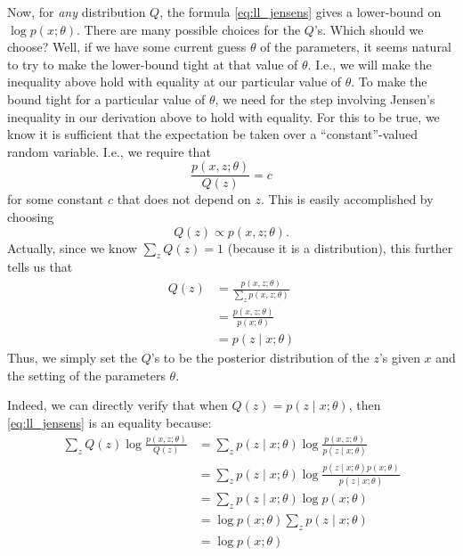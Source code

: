 Now, for \textit{any} distribution $Q$, the formula \ref{eq:ll_jensens} gives a lower-bound on
$\log p(x;\theta)$. There are many possible choices for the $Q$'s. Which should we
choose? Well, if we have some current guess $\theta$ of the parameters, it seems
natural to try to make the lower-bound tight at that value of $\theta$. I.e., we will
make the inequality above hold with equality at our particular value of $\theta$.
To make the bound tight for a particular value of $\theta$, we need for the step
involving Jensen's inequality in our derivation above to hold with equality.
For this to be true, we know it is sufficient that the expectation be taken
over a ``constant''-valued random variable. I.e., we require that
\begin{equation*}
    \frac{p(x,z;\theta)}{Q(z)} = c
\end{equation*}
for some constant $c$ that does not depend on $z$. This is easily accomplished
by choosing
\begin{equation*}
    Q(z) \propto p(x,z;\theta).
\end{equation*}
Actually, since we know
$\sum_z Q(z) = 1$ (because it is a distribution), this further tells us that
\begin{align}
    Q(z) &= \frac{p(x,z;\theta)}{\sum_z p(x,z;\theta)}\\
        &= \frac{p(x,z;\theta)}{p(x;\theta)}\\
        &= p(z \mid x;\theta) \label{eq:q_conditional}
\end{align}
Thus, we simply set the $Q$'s to be the posterior distribution of the $z$'s given
$x$ and the setting of the parameters $\theta$.

Indeed, we can directly verify that when $Q(z) = p(z \mid x;\theta)$, then
\cref{eq:ll_jensens} is an equality because:
\begin{align*}
    \sum_z Q(z)\log\frac{p(x,z;\theta)}{Q(z)} &= \sum_z p(z \mid x;\theta)\log \frac{p(x,z;\theta)}{p(z \mid x;\theta)}\\
        &= \sum_z p(z \mid x;\theta)\log \frac{p(z \mid x;\theta)p(x;\theta)}{p(z \mid x;\theta)}\\
        &= \sum_z p(z \mid x;\theta)\log p(x;\theta)\\
        &= \log p(x;\theta) \sum_z p(z \mid x;\theta)\\
        &= \log p(x;\theta) \tag{because $\sum_z p(z \mid x;\theta) = 1$}    
\end{align*}

